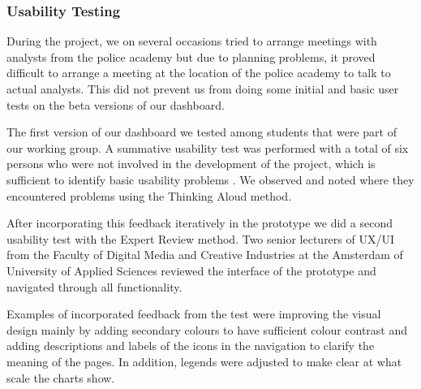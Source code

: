 \subsubsection {Usability Testing}\hfill

During the project, we on several occasions tried to arrange meetings with analysts from the police academy but due to planning problems, it proved difficult to arrange a meeting at the location of the police academy to talk to actual analysts. This did not prevent us from doing some initial and basic user tests on the beta versions of our dashboard. 

The first version of our dashboard we tested among students that were part of our working group. A summative usability test was performed with a total of six persons who were not involved in the development of the project, which is sufficient to identify basic usability problems \cite{nielsen}. We observed and noted where they encountered problems using the Thinking Aloud method. 

After incorporating this feedback iteratively in the prototype we did a second usability test with the Expert Review method. Two senior lecturers of UX/UI from the Faculty of Digital Media and Creative Industries at the Amsterdam of University of Applied Sciences reviewed the interface of the prototype and navigated through all functionality.

Examples of incorporated feedback from the test were improving the visual design mainly by adding secondary colours to have sufficient colour contrast and adding descriptions and labels of the icons in the navigation to clarify the meaning of the pages. In addition,  legends were adjusted to make clear at what scale the charts show.